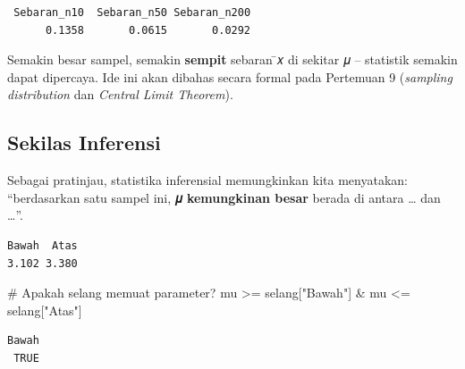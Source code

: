 \documentclass[
  indonesian,
  letterpaper,
]{book}
\newenvironment{Shaded}{\begin{snugshade}}{\end{snugshade}}
\newcommand{\AttributeTok}[1]{\textcolor[rgb]{0.40,0.45,0.13}{#1}}
\newcommand{\CommentTok}[1]{\textcolor[rgb]{0.37,0.37,0.37}{#1}}
\newcommand{\DecValTok}[1]{\textcolor[rgb]{0.68,0.00,0.00}{#1}}
\newcommand{\FunctionTok}[1]{\textcolor[rgb]{0.28,0.35,0.67}{#1}}
\newcommand{\NormalTok}[1]{\textcolor[rgb]{0.00,0.23,0.31}{#1}}
\newcommand{\OtherTok}[1]{\textcolor[rgb]{0.00,0.23,0.31}{#1}}
\newcommand{\SpecialCharTok}[1]{\textcolor[rgb]{0.37,0.37,0.37}{#1}}
\newcommand{\StringTok}[1]{\textcolor[rgb]{0.13,0.47,0.30}{#1}}
\begin{document}
\begin{verbatim}
 Sebaran_n10  Sebaran_n50 Sebaran_n200 
      0.1358       0.0615       0.0292 
\end{verbatim}

Semakin besar sampel, semakin \textbf{sempit} sebaran ̄𝑥 di sekitar 𝜇 --
statistik semakin dapat dipercaya. Ide ini akan dibahas secara formal
pada Pertemuan 9 (\emph{sampling distribution} dan \emph{Central Limit
Theorem}).

\subsection{Sekilas Inferensi}\label{sekilas-inferensi}

Sebagai pratinjau, statistika inferensial memungkinkan kita menyatakan:
``berdasarkan satu sampel ini, \textbf{𝜇 kemungkinan besar} berada di
antara \ldots{} dan \ldots''.

\begin{Shaded}
\end{Shaded}

\begin{verbatim}
Bawah  Atas 
3.102 3.380 
\end{verbatim}

\begin{Shaded}
\begin{Highlighting}[]
\CommentTok{\# Apakah selang memuat parameter?}
\NormalTok{mu }\SpecialCharTok{\textgreater{}=}\NormalTok{ selang[}\StringTok{"Bawah"}\NormalTok{] }\SpecialCharTok{\&}\NormalTok{ mu }\SpecialCharTok{\textless{}=}\NormalTok{ selang[}\StringTok{"Atas"}\NormalTok{]}
\end{Highlighting}
\end{Shaded}

\begin{verbatim}
Bawah 
 TRUE 
\end{verbatim}
\end{document}
